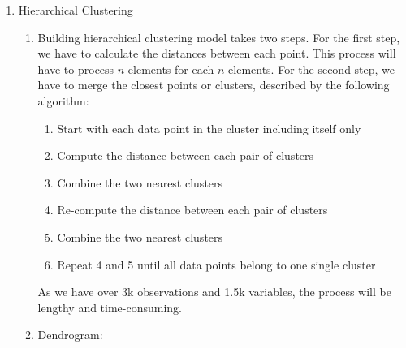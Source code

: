 \documentclass{article}
\begin{document}
\newcommand{\documentcourse}{IIMT2641}
\newcommand{\documentnumber}{5} %





\begin{enumerate}[label=\alph*.]
      \item Hierarchical Clustering
            \begin{enumerate}[label=(\roman*)]
                  \item Building hierarchical clustering model takes two steps. For the first step, we have to calculate the distances between each point. This process will have to process $n$ elements for each $n$ elements. For the second step, we have to merge the closest points or clusters, described by the following algorithm:
                        \begin{enumerate}
                              \item Start with each data point in the cluster including itself only
                              \item Compute the distance between each pair of clusters
                              \item Combine the two nearest clusters
                              \item Re-compute the distance between each pair of clusters
                              \item Combine the two nearest clusters
                              \item Repeat 4 and 5 until all data points belong to one single cluster
                        \end{enumerate}
                        As we have over 3k observations and 1.5k variables, the process will be lengthy and time-consuming.

                  \item Dendrogram:


\end{enumerate}
\end{enumerate}
\end{document}
